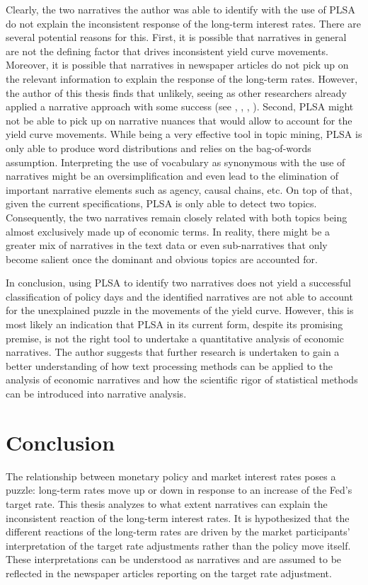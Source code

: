 \documentclass[11pt,a4paper,english,oneside]{book}
\numberwithin{equation}{chapter}
\begin{document}
Clearly, the two narratives the author was able to identify with the use of PLSA do not explain the inconsistent response of the long-term interest rates. There are several potential reasons for this. First, it is possible that narratives in general are not the defining factor that drives inconsistent yield curve movements. Moreover, it is possible that narratives in newspaper articles do not pick up on the relevant information to explain the response of the long-term rates. However, the author of this thesis finds that unlikely, seeing as other researchers already applied a narrative approach with some success (see \cite{Ellingsen.2003}, \cite{Cook.1989}, \cite{Goetzmann.2016}, \cite{Gurkaynak.2004}). Second, PLSA might not be able to pick up on narrative nuances that would allow to account for the yield curve movements. While being a very effective tool in topic mining, PLSA is only able to produce word distributions and relies on the bag-of-words assumption. Interpreting the use of vocabulary as synonymous with the use of narratives might be an oversimplification and even lead to the elimination of important narrative elements such as agency, causal chains, etc. On top of that, given the current specifications, PLSA is only able to detect two topics. Consequently, the two narratives remain closely related with both topics being almost exclusively made up of economic terms. In reality, there might be a greater mix of narratives in the text data or even sub-narratives that only become salient once the dominant and obvious topics are accounted for.

In conclusion, using PLSA to identify two narratives does not yield a successful classification of policy days and the identified narratives are not able to account  for the unexplained puzzle in the movements of the yield curve. However, this is most likely an indication that PLSA in its current form, despite its promising premise, is not the right tool to undertake a quantitative analysis of economic narratives. The author suggests that further research is undertaken to gain a better understanding of how text processing methods can be applied to the analysis of economic narratives and how the scientific rigor of statistical methods can be introduced into narrative analysis. 


\chapter{Conclusion}


The relationship between monetary policy and market interest rates poses a puzzle: long-term rates move up or down in response to an increase of the Fed's target rate. This thesis analyzes to what extent narratives can explain the inconsistent reaction of the long-term interest rates. It is hypothesized that the different reactions of the long-term rates are driven by the market participants' interpretation of the target rate adjustments rather than the policy move itself. These interpretations can be understood as narratives and are assumed to be reflected in the newspaper articles reporting on the target rate adjustment. 
\end{document}
